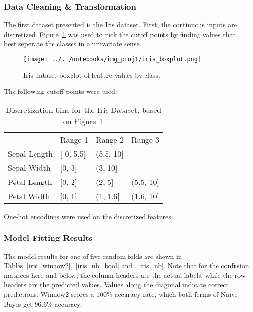 \documentclass{amsart}
\begin{document}
    \subsubsection*{Data Cleaning \& Transformation}
    The first dataset presented is the Iris dataset\cite{irisdataset}. First, the continuous inputs are discretized. Figure~\ref{iris_boxplot}
    was used to pick the cutoff points by finding values that best seperate the classes in a univariate sense.
    \begin{figure}
    \centering
    \texttt{[image: ../../notebooks/img\_proj1/iris\_boxplot.png]}
    \caption{Iris dataset boxplot of feature values by class.}
    \label{iris_boxplot}
    \end{figure}
    The following cutoff points were used:
    \begin{table}[]
    \begin{tabular}{llll}
    {} &  Range 1  & Range 2 & Range 3\\
    Sepal Length &  {[} 0, 5.5{]} & (5.5, 10{]} & {} \\
    Sepal Width &  {[}0, 3{]} & (3, 10{]} & {} \\
    Petal Length &  {[}0, 2{]} & (2, 5{]} & (5.5, 10{]} \\
    Petal Width &  {[}0, 1{]} & (1, 1.6{]} & (1.6, 10{]} \\
    \end{tabular}
    \caption{Discretization bins for the Iris Dataset, based on Figure~\ref{iris_boxplot}}
    \end{table}
    One-hot encodings were used on the discretized features.

    \subsubsection*{Model Fitting Results}
    The model results for one of five random folds are shown in Tables~\ref{iris_winnow2},~\ref{iris_nb_bool} and ~\ref{iris_nb}. Note that for the confusion matrices
    here and below, the column headers are the actual labels, while the row headers are the predicted values. Values along
    the diagonal indicate correct predictions. Winnow2 scores a 100\% accuracy rate, which both forms of Naive Bayes get 96.6\%
    accuracy.
\end{document}
